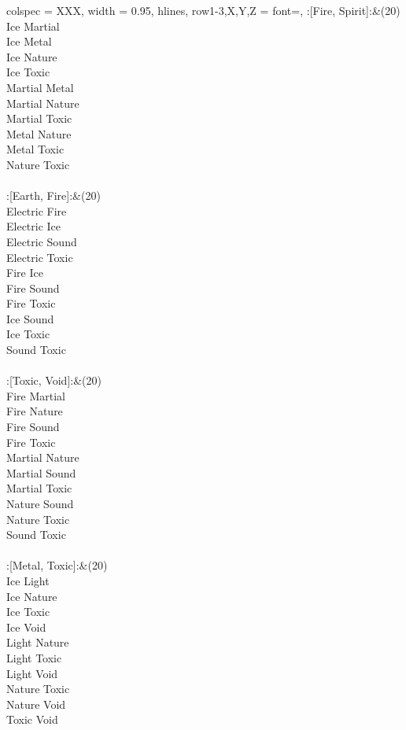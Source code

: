\begin{longtblr}[
	caption = {2v2 Defending Resisted},
	label = {2v2-Defending-Resisted},
]{
	colspec = {XXX}, width = 0.95\linewidth,
	hlines,
	row{1-3,X,Y,Z} = {font=\bfseries},
}
	:[Fire, Spirit]:&{(20)\\
	Ice Martial \\
	Ice Metal \\
	Ice Nature \\
	Ice Toxic \\
	Martial Metal \\
	Martial Nature \\
	Martial Toxic \\
	Metal Nature \\
	Metal Toxic \\
	Nature Toxic \\
	}\\

	:[Earth, Fire]:&{(20)\\
	Electric Fire \\
	Electric Ice \\
	Electric Sound \\
	Electric Toxic \\
	Fire Ice \\
	Fire Sound \\
	Fire Toxic \\
	Ice Sound \\
	Ice Toxic \\
	Sound Toxic \\
	}\\

	:[Toxic, Void]:&{(20)\\
	Fire Martial \\
	Fire Nature \\
	Fire Sound \\
	Fire Toxic \\
	Martial Nature \\
	Martial Sound \\
	Martial Toxic \\
	Nature Sound \\
	Nature Toxic \\
	Sound Toxic \\
	}\\

	:[Metal, Toxic]:&{(20)\\
	Ice Light \\
	Ice Nature \\
	Ice Toxic \\
	Ice Void \\
	Light Nature \\
	Light Toxic \\
	Light Void \\
	Nature Toxic \\
	Nature Void \\
	Toxic Void \\
	}\\


\end{longtblr}
